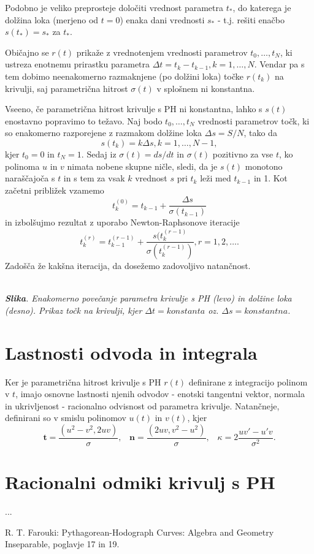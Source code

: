 \documentclass[a4paper]{article}
\begin{document}
	Podobno je veliko preprosteje določiti vrednost parametra $t_*$, do katerega je dolžina loka (merjeno od $t = 0$) enaka dani vrednosti $s_*$ - t.j. rešiti enačbo $s (t_*) = s_*$ za $t_*$.
	
	Običajno se $r (t)$ prikaže z vrednotenjem vrednosti parametrov $t_0,\ldots , t_N$, ki ustreza enotnemu prirastku parametra $\Delta t = t_k- t_{k- 1}, k = 1,\ldots , N$. Vendar pa s tem dobimo neenakomerno razmaknjene (po dolžini loka) točke $r (t_k)$ na krivulji, saj parametrična hitrost $\sigma (t)$ v splošnem ni konstantna.
	
	Vseeno, če parametrična hitrost krivulje s PH ni konstantna, lahko s $s (t)$ enostavno popravimo to težavo. Naj bodo $t_0,\ldots, t_N$ vrednosti parametrov točk, ki so enakomerno razporejene z razmakom dolžine loka $\Delta s = S / N$, tako da
	$$s (t_k) = k\Delta s, k = 1,\ldots , N - 1,$$
	kjer $t_0 = 0$ in $t_N = 1$. Sedaj iz $\sigma (t) = ds / dt$ in $\sigma (t)$ pozitivno za vse $t$, ko polinoma $u$ in $v$ nimata nobene skupne ničle, sledi, da je $s (t)$ monotono naraščajoča s $t$ in s tem za vsak $k$ vrednost $s$ pri $t_k$ leži med $t_{k - 1}$ in 1. Kot začetni približek vzamemo
	$$t^{(0)}_k = t_{k-1}+\frac{\Delta s}{\sigma(t_{k-1})}$$
	in izbolšujmo rezultat z uporabo Newton-Raphsonove iteracije
	$$t^{(r)}_k = t^{(r-1)}_{k-1}+\frac{s(t^{(r-1)}_k}{\sigma(t^{(r-1)}_k)}, r = 1, 2,\ldots.$$
	Zadošča že kakšna iteracija, da dosežemo zadovoljivo natančnost.
	
	
	\textit{\\ \textbf{Slika}. Enakomerno povečanje parametra krivulje s PH (levo) in dolžine loka (desno). Prikaz točk na krivulji, kjer $\Delta t = konstanta$ oz. $\Delta s = konstantna$.}
	
	\section{Lastnosti odvoda in integrala}
	Ker je parametrična hitrost krivulje s PH $r (t)$ definirane z integracijo polinom v $t$, imajo osnovne lastnosti njenih odvodov - enotski tangentni vektor, normala in ukrivljenost - racionalno odvisnost od parametra krivulje. Natančneje, definirani so v smislu polinomov $u (t)$ in $v (t)$, kjer
	$$\textbf{t} =\frac{(u^2 - v^2, 2uv)}{\sigma},\hspace{10pt} \textbf{n} =\frac{(2uv, v^2 - u^2)}{\sigma},\hspace{10pt} \kappa = 2 \frac{uv\prime - u\prime v}{\sigma^2}.$$
	
	\section{Racionalni odmiki krivulj s PH}
	...
	
	\begin{thebibliography}{1}
		 R. T. Farouki: Pythagorean-Hodograph Curves: Algebra and Geometry Inseparable, poglavje 17 in 19.
	\end{thebibliography}
\end{document}
